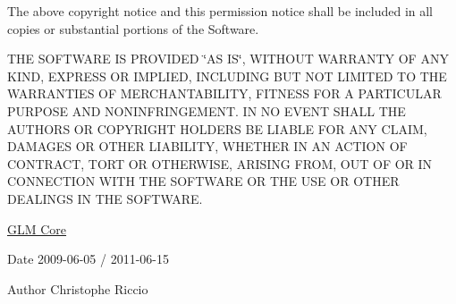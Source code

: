 \-The above copyright notice and this permission notice shall be included in all copies or substantial portions of the \-Software.

\-T\-H\-E \-S\-O\-F\-T\-W\-A\-R\-E \-I\-S \-P\-R\-O\-V\-I\-D\-E\-D \char`\"{}\-A\-S I\-S\char`\"{}, \-W\-I\-T\-H\-O\-U\-T \-W\-A\-R\-R\-A\-N\-T\-Y \-O\-F \-A\-N\-Y \-K\-I\-N\-D, \-E\-X\-P\-R\-E\-S\-S \-O\-R \-I\-M\-P\-L\-I\-E\-D, \-I\-N\-C\-L\-U\-D\-I\-N\-G \-B\-U\-T \-N\-O\-T \-L\-I\-M\-I\-T\-E\-D \-T\-O \-T\-H\-E \-W\-A\-R\-R\-A\-N\-T\-I\-E\-S \-O\-F \-M\-E\-R\-C\-H\-A\-N\-T\-A\-B\-I\-L\-I\-T\-Y, \-F\-I\-T\-N\-E\-S\-S \-F\-O\-R \-A \-P\-A\-R\-T\-I\-C\-U\-L\-A\-R \-P\-U\-R\-P\-O\-S\-E \-A\-N\-D \-N\-O\-N\-I\-N\-F\-R\-I\-N\-G\-E\-M\-E\-N\-T. \-I\-N \-N\-O \-E\-V\-E\-N\-T \-S\-H\-A\-L\-L \-T\-H\-E \-A\-U\-T\-H\-O\-R\-S \-O\-R \-C\-O\-P\-Y\-R\-I\-G\-H\-T \-H\-O\-L\-D\-E\-R\-S \-B\-E \-L\-I\-A\-B\-L\-E \-F\-O\-R \-A\-N\-Y \-C\-L\-A\-I\-M, \-D\-A\-M\-A\-G\-E\-S \-O\-R \-O\-T\-H\-E\-R \-L\-I\-A\-B\-I\-L\-I\-T\-Y, \-W\-H\-E\-T\-H\-E\-R \-I\-N \-A\-N \-A\-C\-T\-I\-O\-N \-O\-F \-C\-O\-N\-T\-R\-A\-C\-T, \-T\-O\-R\-T \-O\-R \-O\-T\-H\-E\-R\-W\-I\-S\-E, \-A\-R\-I\-S\-I\-N\-G \-F\-R\-O\-M, \-O\-U\-T \-O\-F \-O\-R \-I\-N \-C\-O\-N\-N\-E\-C\-T\-I\-O\-N \-W\-I\-T\-H \-T\-H\-E \-S\-O\-F\-T\-W\-A\-R\-E \-O\-R \-T\-H\-E \-U\-S\-E \-O\-R \-O\-T\-H\-E\-R \-D\-E\-A\-L\-I\-N\-G\-S \-I\-N \-T\-H\-E \-S\-O\-F\-T\-W\-A\-R\-E.

\hyperlink{group__core}{\-G\-L\-M \-Core}

\begin{DoxyDate}{\-Date}
2009-\/06-\/05 / 2011-\/06-\/15 
\end{DoxyDate}
\begin{DoxyAuthor}{\-Author}
\-Christophe \-Riccio 
\end{DoxyAuthor}
